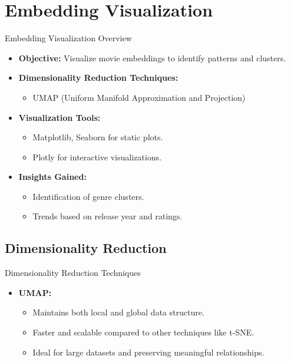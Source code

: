 \documentclass{beamer}
\begin{document}
\section{Embedding Visualization}
\begin{frame}{Embedding Visualization Overview}
  \begin{itemize}
    \item \textbf{Objective:} Visualize movie embeddings to identify patterns and clusters.
    \item \textbf{Dimensionality Reduction Techniques:}
      \begin{itemize}
        \item UMAP (Uniform Manifold Approximation and Projection)
      \end{itemize}
    \item \textbf{Visualization Tools:}
      \begin{itemize}
        \item Matplotlib, Seaborn for static plots.
        \item Plotly for interactive visualizations.
      \end{itemize}
    \item \textbf{Insights Gained:}
      \begin{itemize}
        \item Identification of genre clusters.
        \item Trends based on release year and ratings.
      \end{itemize}
  \end{itemize}
\end{frame}

\subsection{Dimensionality Reduction}
\begin{frame}{Dimensionality Reduction Techniques}
  \begin{itemize}
    \item \textbf{UMAP:}
      \begin{itemize}
        \item Maintains both local and global data structure.
        \item Faster and scalable compared to other techniques like t-SNE.
        \item Ideal for large datasets and preserving meaningful relationships.
      \end{itemize}
  \end{itemize}
\end{frame}
\end{document}
